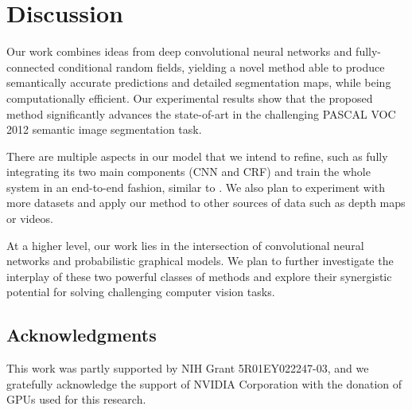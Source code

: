 \section{Discussion}
\label{sec:discussion}

Our work combines ideas from deep convolutional neural networks and
fully-connected conditional random fields, yielding a novel method able to
produce semantically accurate predictions and detailed segmentation maps,
while being computationally efficient. Our experimental results show that the
proposed method significantly advances the state-of-art in the challenging
PASCAL VOC 2012 semantic image segmentation task.

There are multiple aspects in our model that we intend to refine, such as
fully integrating its two main components (CNN and CRF) and train the whole
system in an end-to-end fashion, similar to \citet{Koltun13, chen2014learning}.
We also plan to experiment with more datasets and apply our method to other 
sources of data such as depth maps or videos.

At a higher level, our work lies in the intersection of convolutional neural
networks and probabilistic graphical models. We plan to further investigate
the interplay of these two powerful classes of methods and explore their
synergistic potential for solving challenging computer vision tasks.

\subsection*{Acknowledgments} 

This work was partly supported by NIH Grant 5R01EY022247-03, and we gratefully acknowledge the support of NVIDIA Corporation with the donation of GPUs used for this research. 
